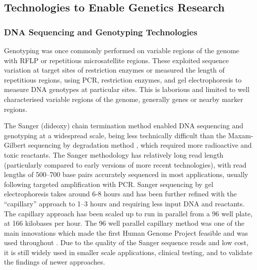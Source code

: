 \subsection{Technologies to Enable Genetics Research}
\subsubsection{DNA Sequencing and Genotyping Technologies}
Genotyping was once commonly performed on variable regions of the genome with \gls{RFLP} or repetitious microsatellite regions. These exploited sequence variation at target sites of restriction enzymes or measured the length of repetitious regions, using \gls{PCR}, restriction enzymes, and gel electrophoresis to measure \gls{DNA} genotypes at particular sites. This is laborious and limited to well characterised variable regions of the genome, generally genes or nearby marker regions. 

The \gls{Sanger} (dideoxy) chain termination method \citep{Sanger1975} enabled DNA sequencing and genotyping at a widespread scale, being less technically difficult than the Maxam-Gilbert sequencing by degradation method \citep{Gilbert1973, Maxam1977}, which required more radioactive and toxic reactants. The \gls{Sanger} methodology has relatively long read length (particularly compared to early versions of more recent technologies), with read lengths of 500--700 base pairs accurately sequenced in most applications, usually following targeted amplification with \gls{PCR}. \gls{Sanger} sequencing by gel electrophoresis takes around 6-8 hours and has been further refined with the ``capillary'' approach to 1--3 hours and requiring less input DNA and reactants. The capillary approach has been scaled up to run in parallel from a 96 well plate, at 166 kilobases per hour. The 96 well parallel capillary method was one of the main innovations which made the first Human Genome Project feasible and was used throughout \citep{Lander2001}. Due to the quality of the \gls{Sanger} sequence reads and low cost, it is still widely used in smaller scale applications, clinical testing, and to validate the findings of newer approaches.


